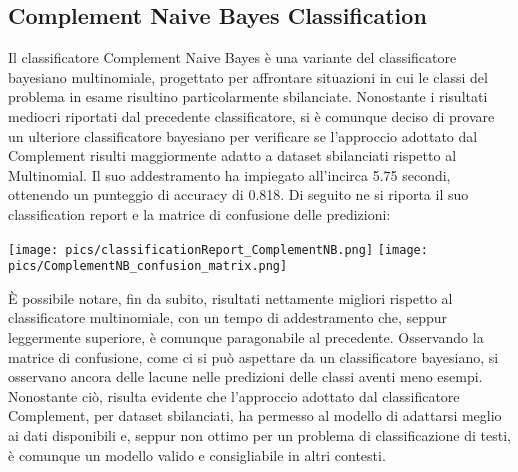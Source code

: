 \documentclass[12pt,oneside]{article}
\begin{document}
    \newpage
    \begin{enumerate}
    \subsection{Complement Naive Bayes Classification}
    \begin{justify}
        Il classificatore Complement Naive Bayes è una variante del classificatore bayesiano multinomiale, progettato per affrontare situazioni in cui le classi del problema in esame risultino particolarmente sbilanciate. Nonostante i risultati mediocri riportati dal precedente classificatore, si è comunque deciso di provare un ulteriore classificatore bayesiano per verificare se l’approccio adottato dal Complement risulti maggiormente adatto a dataset sbilanciati rispetto al Multinomial.
        Il suo addestramento ha impiegato all’incirca 5.75 secondi, ottenendo un punteggio di accuracy di 0.818. 
        Di seguito ne si riporta il suo classification report e la matrice di confusione delle predizioni:
    \end{justify}

    \centering
    \texttt{[image: pics/classificationReport\_ComplementNB.png]}
    \texttt{[image: pics/ComplementNB\_confusion\_matrix.png]}

    \begin{justify}
    È possibile notare, fin da subito, risultati nettamente migliori rispetto al classificatore multinomiale, con un tempo di addestramento che, seppur leggermente superiore, è comunque paragonabile al precedente. Osservando la matrice di confusione, come ci si può aspettare da un classificatore bayesiano, si osservano ancora delle lacune nelle predizioni delle classi aventi meno esempi. Nonostante ciò, risulta evidente che l’approccio adottato dal classificatore Complement, per dataset sbilanciati, ha permesso al modello di adattarsi meglio ai dati disponibili e, seppur non ottimo per un problema di classificazione di testi, è comunque un modello valido e consigliabile in altri contesti.
    \end{justify}
    \end{enumerate}
\end{document}
